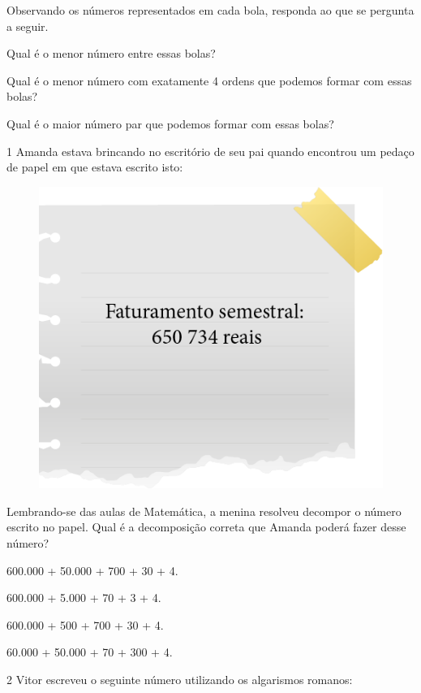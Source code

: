 Observando os números representados em cada bola, responda ao que se pergunta a seguir.

\begin{escolha}
\item
  Qual é o menor número entre essas bolas? 

\item
  Qual é o menor número com exatamente 4 ordens que podemos formar com essas bolas? 

\item
  Qual é o maior número par que podemos formar com essas bolas? 
\end{escolha}



\num{1} Amanda estava brincando no escritório de seu pai quando encontrou um
pedaço de papel em que estava escrito isto:

\begin{figure}[htpb!]
\centering
\includegraphics[width=.4\textwidth]{media/image8.png}
\end{figure}

\pagebreak
Lembrando-se das aulas de Matemática, a menina resolveu decompor o número escrito
no papel. Qual é a decomposição correta que Amanda poderá fazer desse
número?

\begin{escolha}
\item
  600.000 + 50.000 + 700 + 30 + 4.
\item
  600.000 + 5.000 + 70 + 3 + 4.
\item
  600.000 + 500 + 700 + 30 + 4.
\item
  60.000 + 50.000 + 70 + 300 + 4.
\end{escolha}

\num{2} Vitor escreveu o seguinte número utilizando os algarismos romanos:

